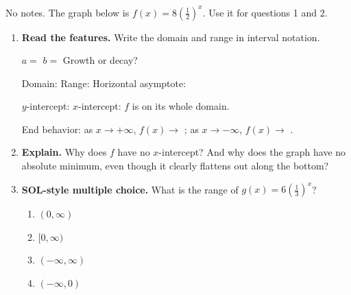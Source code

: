 \documentclass[10pt]{article}
\newcommand{\lgrid}[4]{%
  \draw[step=1, linegray!40, very thin] (#1,#3) grid (#2,#4);
  \draw[->, semithick, charcoal] (#1,0)--(#2,0) node[below right, font=\scriptsize]{$x$};
  \draw[->, semithick, charcoal] (0,#3)--(0,#4) node[left, font=\scriptsize]{$y$};}
\newcommand{\expcurve}[4]{\draw[very thick, forest, domain=#3:#4, samples=120, smooth]
  plot (\x,{#1*exp((#2)*(\x))});}
\begin{document}
\namedateperiod

\vspace{0.08in}

No notes. The graph below is $f(x) = 8\left(\frac12\right)^{x}$. Use it for questions 1 and 2.
\begin{center}
\end{center}

\begin{enumerate}[leftmargin=1.8em, itemsep=8pt]
  \item \textbf{Read the features.} Write the domain and range in interval notation.

        $a=$ \blank{1.2cm} \quad $b=$ \blank{1.2cm} \quad Growth or decay? \blank{2.2cm}

        \vspace{3pt}
        Domain: \blank{3.0cm} \quad Range: \blank{3.0cm} \quad
        Horizontal asymptote: \blank{2.0cm}

        \vspace{3pt}
        $y$-intercept: \blank{1.8cm} \quad $x$-intercept: \blank{1.8cm} \quad
        $f$ is \blank{2.4cm} on its whole domain.

        \vspace{3pt}
        End behavior: as $x\to+\infty$, $f(x)\to$ \blank{1.4cm}; \; as $x\to-\infty$,
        $f(x)\to$ \blank{1.4cm}.

  \item \textbf{Explain.} Why does $f$ have no $x$-intercept? And why does the graph have no
        absolute minimum, even though it clearly flattens out along the bottom?

  \item \textbf{SOL-style multiple choice.} What is the range of $g(x) = 6\left(\frac13\right)^{x}$?
        \begin{enumerate}[label=\Alph*., leftmargin=1.9em, itemsep=1pt]
          \item $(0,\infty)$
          \item $[0,\infty)$
          \item $(-\infty,\infty)$
          \item $(-\infty,0)$
        \end{enumerate}
\end{enumerate}
\end{document}
